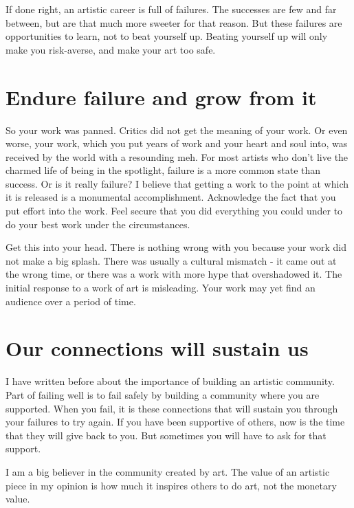 \documentclass[
]{book}
\begin{document}
If done right, an artistic career is full of failures. The successes are few and far between, but are that much more sweeter for that reason. But these failures are opportunities to learn, not to beat yourself up. Beating yourself up will only make you risk-averse, and make your art too safe.

\hypertarget{endure-failure-and-grow-from-it}{%
\section{Endure failure and grow from it}\label{endure-failure-and-grow-from-it}}

So your work was panned. Critics did not get the meaning of your work. Or even worse, your work, which you put years of work and your heart and soul into, was received by the world with a resounding meh. For most artists who don't live the charmed life of being in the spotlight, failure is a more common state than success. Or is it really failure? I believe that getting a work to the point at which it is released is a monumental accomplishment. Acknowledge the fact that you put effort into the work. Feel secure that you did everything you could under to do your best work under the circumstances.

Get this into your head. There is nothing wrong with you because your work did not make a big splash. There was usually a cultural mismatch - it came out at the wrong time, or there was a work with more hype that overshadowed it. The initial response to a work of art is misleading. Your work may yet find an audience over a period of time.

\hypertarget{our-connections-will-sustain-us}{%
\section{Our connections will sustain us}\label{our-connections-will-sustain-us}}

I have written before about the importance of building an artistic community. Part of failing well is to fail safely by building a community where you are supported. When you fail, it is these connections that will sustain you through your failures to try again. If you have been supportive of others, now is the time that they will give back to you. But sometimes you will have to ask for that support.

I am a big believer in the community created by art. The value of an artistic piece in my opinion is how much it inspires others to do art, not the monetary value.
\end{document}

